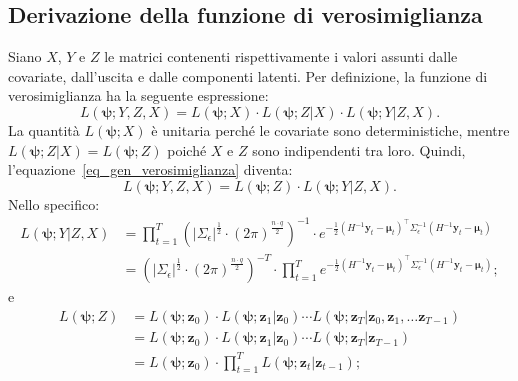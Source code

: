 \subsection[Derivazione della funzione di verosimiglianza]{Derivazione della funzione di verosimiglianza}
Siano $X$, $Y$ e $Z$ le matrici contenenti rispettivamente i valori assunti dalle covariate, dall'uscita e dalle componenti latenti. Per definizione, la funzione di verosimiglianza ha la seguente espressione:
\begin{equation}
	L(\boldsymbol{\psi}; Y,Z,X) = L(\boldsymbol{\psi}; X)\cdot L(\boldsymbol{\psi}; Z|X)\cdot L(\boldsymbol{\psi}; Y|Z,X).
	\label{eq_gen_verosimiglianza}
\end{equation}
La quantità $L(\boldsymbol{\psi}; X)$ è unitaria perché le covariate sono deterministiche, mentre $L(\boldsymbol{\psi}; Z|X) = L(\boldsymbol{\psi}; Z)$ poiché $X$ e $Z$ sono indipendenti tra loro. Quindi, l'equazione~\ref{eq_gen_verosimiglianza} diventa:
\begin{equation}
	L(\boldsymbol{\psi}; Y,Z,X) =  L(\boldsymbol{\psi}; Z)\cdot L(\boldsymbol{\psi}; Y|Z,X).
	\label{eq_gen_verosimiglianza_2}
\end{equation}
Nello specifico:
\begin{equation}
	\begin{split}
		L(\boldsymbol{\psi}; Y|Z, X) & = \prod_{t=1}^{T}\left(|\Sigma_\epsilon|^\frac{1}{2}\cdot\left(2\pi\right)^\frac{n\cdot q}{2}\right)^{-1}\cdot e^{-\frac{1}{2}\left(H^{-1}\mathbf{y}_t - \boldsymbol{\mu}_t\right)^\top\Sigma_\epsilon^{-1}\left(H^{-1}\mathbf{y}_t - \boldsymbol{\mu}_t\right)} \\
		& = \left(|\Sigma_\epsilon|^\frac{1}{2}\cdot\left(2\pi\right)^\frac{n\cdot q}{2}\right)^{-T}\cdot\prod_{t=1}^{T} e^{-\frac{1}{2}\left(H^{-1}\mathbf{y}_t - \boldsymbol{\mu}_t\right)^\top\Sigma_\epsilon^{-1}\left(H^{-1}\mathbf{y}_t - \boldsymbol{\mu}_t\right)};
	\end{split}
\end{equation}
e
\begin{equation}
	\begin{split}
		L(\boldsymbol{\psi}; Z) & = L(\boldsymbol{\psi}; \mathbf{z}_0)\cdot L(\boldsymbol{\psi}; \mathbf{z}_1|\mathbf{z}_0)\cdots L(\boldsymbol{\psi}; \mathbf{z}_T|\mathbf{z}_0, \mathbf{z}_1,\dots\mathbf{z}_{T-1}) \\
		& = L(\boldsymbol{\psi}; \mathbf{z}_0)\cdot L(\boldsymbol{\psi}; \mathbf{z}_1|\mathbf{z}_0)\cdots L(\boldsymbol{\psi}; \mathbf{z}_T|\mathbf{z}_{T-1})\\
		& = L(\boldsymbol{\psi}; \mathbf{z}_0)\cdot\prod_{t=1}^{T}L(\boldsymbol{\psi};\mathbf{z}_t|\mathbf{z}_{t-1});
	\end{split}
	\label{eq_verosimiglianza_y}
\end{equation}
